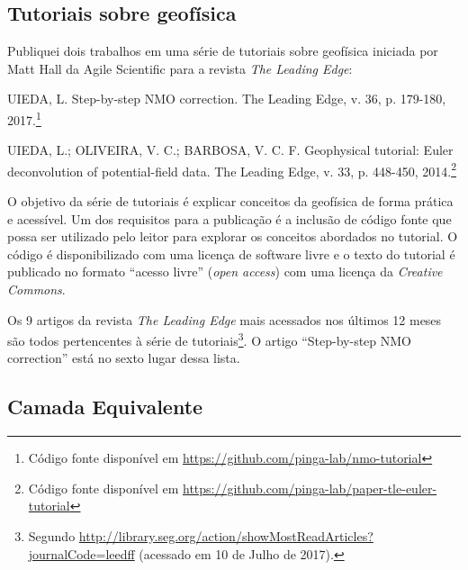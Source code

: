 \subsection{Tutoriais sobre geofísica}

Publiquei dois trabalhos em uma série de tutoriais sobre geofísica iniciada por
Matt Hall da Agile Scientific \citep{hall_user_2016} para a revista \textit{The
Leading Edge}:

\begin{displayquote}
    UIEDA, L. Step-by-step NMO correction. The Leading Edge, v. 36, p.
    179-180, 2017.\footnote{Código fonte disponível em
    \url{https://github.com/pinga-lab/nmo-tutorial}}
\end{displayquote}

\begin{displayquote}
    UIEDA, L.; OLIVEIRA, V. C.; BARBOSA, V. C. F. Geophysical tutorial: Euler
    deconvolution of potential-field data. The Leading Edge, v. 33, p. 448-450,
    2014.\footnote{Código fonte disponível em
    \url{https://github.com/pinga-lab/paper-tle-euler-tutorial}}
\end{displayquote}

O objetivo da série de tutoriais é explicar conceitos da geofísica de forma
prática e acessível.
Um dos requisitos para a publicação é a inclusão de código fonte que possa ser
utilizado pelo leitor para explorar os conceitos abordados no tutorial.
O código é disponibilizado com uma licença de software livre
e o texto do tutorial é publicado no formato ``acesso livre'' (\textit{open
access}) com uma licença da \textit{Creative Commons}.

Os 9 artigos da revista \textit{The Leading Edge} mais acessados nos últimos 12
meses são todos pertencentes à série de tutoriais\footnote{Segundo
\url{http://library.seg.org/action/showMostReadArticles?journalCode=leedff}
(acessado em 10 de Julho de 2017).}.
O artigo ``Step-by-step NMO correction'' está no sexto lugar dessa lista.



\subsection{Camada Equivalente}

